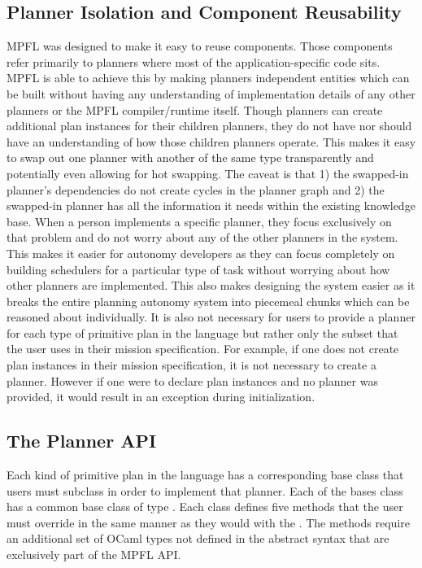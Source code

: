 \subsection{Planner Isolation and Component Reusability}
MPFL was designed to make it easy to reuse components. Those components refer primarily to planners where most of the application-specific code sits. MPFL is able to achieve this by making planners independent entities which can be built without having any understanding of implementation details of any other planners or the MPFL compiler/runtime itself. Though planners can create additional plan instances for their children planners, they do not have nor should have an understanding of how those children planners operate. This makes it easy to swap out one planner with another of the same type transparently and potentially even allowing for hot swapping. The caveat is that 1) the swapped-in planner's dependencies do not create cycles in the planner graph and 2) the swapped-in planner has all the information it needs within the existing knowledge base. When a person implements a specific planner, they focus exclusively on that problem and do not worry about any of the other planners in the system. This makes it easier for autonomy developers as they can focus completely on building schedulers for a particular type of task without worrying about how other planners are implemented. This also makes designing the system easier as it breaks the entire planning autonomy system into piecemeal chunks which can be reasoned about individually. It is also not necessary for users to provide a planner for each type of primitive plan in the language but rather only the subset that the user uses in their mission specification. For example, if one does not create  plan instances in their mission specification, it is not necessary to create a  planner. However if one were to declare  plan instances and no  planner was provided, it would result in an exception during initialization.

\subsection{The Planner API}
Each kind of primitive plan in the language has a corresponding base class that users must subclass in order to implement that planner.  Each of the bases class has a common base class of type . Each class defines five methods that the user must override in the same manner as they would with the . The methods require an additional set of OCaml types not defined in the abstract syntax that are exclusively part of the MPFL API.


